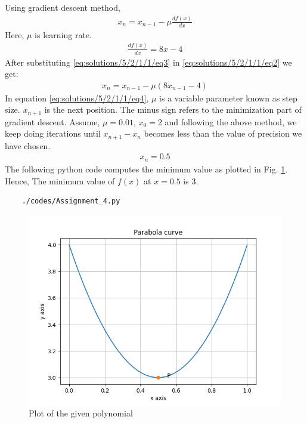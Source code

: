    Using gradient descent method,
    \begin{align}
    x_n=x_{n-1}-\mu\frac{df(x)}{dx} \label{eq:solutions/5/2/1/1/eq2}
    \end{align}
    Here, $\mu$ is learning rate.\\
    \begin{align}
    \frac{df(x)}{dx}=8x-4 \label{eq:solutions/5/2/1/1/eq3}
\end{align}
After substituting \ref{eq:solutions/5/2/1/1/eq3} in \ref{eq:solutions/5/2/1/1/eq2} we get:
\begin{align}
x_n=x_{n-1}-\mu( 8x_{n-1}-4)\label{eq:solutions/5/2/1/1/eq4}
\end{align}
In equation \eqref{eq:solutions/5/2/1/1/eq4}, $\mu$ is a variable parameter known as step size. $x_{n+1}$ is the next position. The minus sign refers to the minimization part of gradient descent. Assume, $\mu=0.01$, $x_0=2$ and following the above method, we keep doing iterations until $x_{n+1}-x_{n}$ becomes less than the value of precision we have chosen.
\begin{align}
    x_n=0.5
\end{align}
The following python code computes the minimum value as plotted in Fig. \ref{eq:solutions/5/2/1/1/fig:5.1}. Hence, The minimum value of $f(x)$ at $x=0.5$ is 3.
	\begin{lstlisting}
	./codes/Assignment_4.py
	\end{lstlisting}
		\begin{figure}[!ht]
	\centering
	\includegraphics[width=\columnwidth]{./solutions/5/2/1/1/Figure_1.png}
	\caption{Plot of the given polynomial}
	\label{eq:solutions/5/2/1/1/fig:5.1}	
	\end{figure}

